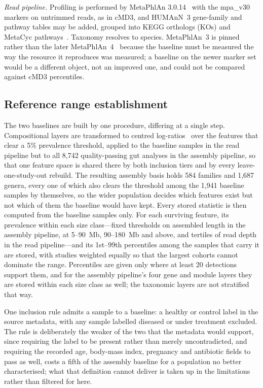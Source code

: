 \documentclass[conference]{IEEEtran}
\begin{document}
\emph{Read pipeline.} Profiling is performed by MetaPhlAn 3.0.14~\cite{beghini2021} with the mpa\_v30 markers on untrimmed reads, as in cMD3, and HUMAnN~3 gene-family and pathway tables may be added, grouped into KEGG orthologs (KOs) and MetaCyc pathways~\cite{caspi2020}. Taxonomy resolves to species. MetaPhlAn~3 is pinned rather than the later MetaPhlAn~4~\cite{blanco2023} because the baseline must be measured the way the resource it reproduces was measured; a baseline on the newer marker set would be a different object, not an improved one, and could not be compared against cMD3 percentiles.

\subsection{Reference range establishment}

The two baselines are built by one procedure, differing at a single step. Compositional layers are transformed to centred log-ratios~\cite{aitchison1982} over the features that clear a 5\% prevalence threshold, applied to the baseline samples in the read pipeline but to all 8{,}742 quality-passing gut analyses in the assembly pipeline, so that one feature space is shared there by both inclusion tiers and by every leave-one-study-out rebuild. The resulting assembly basis holds 584 families and 1{,}687 genera, every one of which also clears the threshold among the 1{,}941 baseline samples by themselves, so the wider population decides which features exist but not which of them the baseline would have kept. Every stored statistic is then computed from the baseline samples only. For each surviving feature, its prevalence within each size class---fixed thresholds on assembled length in the assembly pipeline, at 5--90~Mb, 90--180~Mb and above, and tertiles of read depth in the read pipeline---and its 1st--99th percentiles among the samples that carry it are stored, with studies weighted equally so that the largest cohorts cannot dominate the range. Percentiles are given only where at least 20 detections support them, and for the assembly pipeline's four gene and module layers they are stored within each size class as well; the taxonomic layers are not stratified that way.

One inclusion rule admits a sample to a baseline: a healthy or control label in the source metadata, with any sample labelled diseased or under treatment excluded. The rule is deliberately the weaker of the two that the metadata would support, since requiring the label to be present rather than merely uncontradicted, and requiring the recorded age, body-mass index, pregnancy and antibiotic fields to pass as well, costs a fifth of the assembly baseline for a population no better characterised; what that definition cannot deliver is taken up in the limitations rather than filtered for here.
\end{document}
